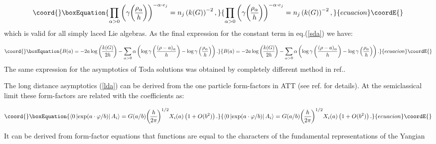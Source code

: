 \documentclass[a4paper,12pt]{article}
\begin{document}
\begin{equation}\coord{}\boxEquation{
\prod_{\alpha >0}\left( \gamma 
{\rho _\alpha  \overwithdelims() h}
\right) ^{-\alpha \cdot e_j}=n_j\left( k(G)\right) ^{-2},  \label{gfr}
}{
\prod_{\alpha >0}\left( \gamma 
{\rho _\alpha  \overwithdelims() h}
\right) ^{-\alpha \cdot e_j}=n_j\left( k(G)\right) ^{-2},  }{ecuacion}\coordE{}\end{equation}
which is valid for all simply laced Lie algebras. As the final expression
for the constant term in eq.(\ref{sda}) we have:

\begin{equation}\coord{}\boxEquation{
B(a)=-2a\log {k(G) \overwithdelims() 2h}
-\sum_{\alpha >0}\alpha \left( \log \gamma \left( \frac{(\rho -a)_\alpha }h
\right) -\log \gamma \left( \frac{\rho _\alpha }h\right) \right).  \label{baf}
}{
B(a)=-2a\log {k(G) \overwithdelims() 2h}
-\sum_{\alpha >0}\alpha \left( \log \gamma \left( \frac{(\rho -a)_\alpha }h
\right) -\log \gamma \left( \frac{\rho _\alpha }h\right) \right).  }{ecuacion}\coordE{}\end{equation}
The same expression for the asymptotics of \coordHE{} Toda solutions was
obtained by completely different method in ref.\cite{TW}.

The long distance asymptotics (\ref{lda}) can be derived from the one
particle form-factors in ATT (see ref.\cite{SL} for details). At the
semiclassical limit \coordHE{} these form-factors are related with the
coefficients \coordHE{} as:

\begin{equation}\coord{}\boxEquation{
\left\langle 0\left| \exp (a\cdot \varphi /b)\right| A_i\right\rangle =G(a/b)
{h \overwithdelims() 2\pi }
^{1/2}X_i(a)\left( 1+O(b^2)\right).  \label{ff}
}{
\left\langle 0\left| \exp (a\cdot \varphi /b)\right| A_i\right\rangle =G(a/b)
{h \overwithdelims() 2\pi }
^{1/2}X_i(a)\left( 1+O(b^2)\right).  }{ecuacion}\coordE{}\end{equation}

It can be derived from form-factor equations that functions \coordHE{} are
equal to the characters of the fundamental representations \coordHE{} of the
Yangian \coordHE{}
\end{document}
